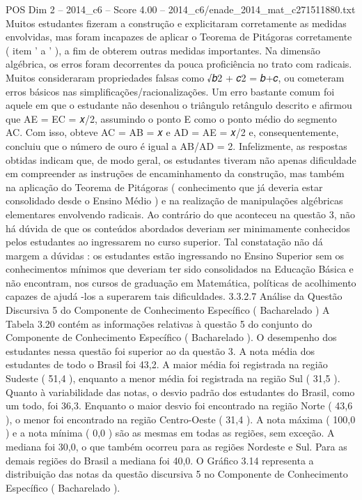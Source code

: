 \begin{textsample}{POS Dim 2 – 2014\_c6 – Score 4.00 – 2014\_c6/enade\_2014\_mat\_c271511880.txt}
Muitos estudantes fizeram a construção e explicitaram corretamente as medidas envolvidas, mas foram incapazes de aplicar o Teorema de Pitágoras corretamente ( item ’ a ’ ), a fim de obterem outras medidas importantes.
Na dimensão algébrica, os erros foram decorrentes da pouca proficiência no trato com radicais.
Muitos consideraram propriedades falsas como √𝑏2 + 𝑐2 = 𝑏+𝑐, ou cometeram erros básicos nas simplificações/racionalizações.
Um erro bastante comum foi aquele em que o estudante não desenhou o triângulo retângulo descrito e afirmou que AE = EC = 𝑥/2, assumindo o ponto E como o ponto médio do segmento AC.
Com isso, obteve AC = AB = 𝑥 e AD = AE = 𝑥/2 e, consequentemente, concluiu que o número de ouro é igual a AB/AD = 2.
Infelizmente, as respostas obtidas indicam que, de modo geral, os estudantes tiveram não apenas dificuldade em compreender as instruções de encaminhamento da construção, mas também na aplicação do Teorema de Pitágoras ( conhecimento que já deveria estar consolidado desde o Ensino Médio ) e na realização de manipulações algébricas elementares envolvendo radicais.
Ao contrário do que aconteceu na questão 3, não há dúvida de que os conteúdos abordados deveriam ser minimamente conhecidos pelos estudantes ao ingressarem no curso superior.
Tal constatação não dá margem a dúvidas : os estudantes estão ingressando no Ensino Superior sem os conhecimentos mínimos que deveriam ter sido consolidados na Educação Básica e não encontram, nos cursos de graduação em Matemática, políticas de acolhimento capazes de ajudá -los a superarem tais dificuldades. 3.3.2.7 Análise da Questão Discursiva 5 do Componente de Conhecimento Específico ( Bacharelado ) A Tabela 3.20 contém as informações relativas à questão 5 do conjunto do Componente de Conhecimento Específico ( Bacharelado ).
O desempenho dos estudantes nessa questão foi superior ao da questão 3.
A nota média dos estudantes de todo o Brasil foi 43,2.
A maior média foi registrada na região Sudeste ( 51,4 ), enquanto a menor média foi registrada na região Sul ( 31,5 ).
Quanto à variabilidade das notas, o desvio padrão dos estudantes do Brasil, como um todo, foi 36,3.
Enquanto o maior desvio foi encontrado na região Norte ( 43,6 ), o menor foi encontrado na região Centro-Oeste ( 31,4 ).
A nota máxima ( 100,0 ) e a nota mínima ( 0,0 ) são as mesmas em todas as regiões, sem exceção.
A mediana foi 30,0, o que também ocorreu para as regiões Nordeste e Sul.
Para as demais regiões do Brasil a mediana foi 40,0.
O Gráfico 3.14 representa a distribuição das notas da questão discursiva 5 no Componente de Conhecimento Específico ( Bacharelado ).

\end{textsample}
